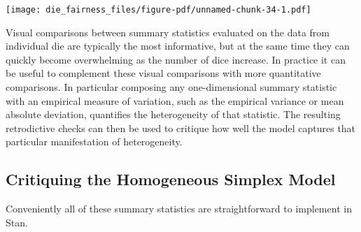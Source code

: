 \documentclass[
  letterpaper,
  DIV=11,
  numbers=noendperiod]{scrartcl}
\newenvironment{Shaded}{\begin{snugshade}}{\end{snugshade}}
\newcommand{\AttributeTok}[1]{\textcolor[rgb]{0.40,0.45,0.13}{#1}}
\newcommand{\ConstantTok}[1]{\textcolor[rgb]{0.56,0.35,0.01}{#1}}
\newcommand{\DecValTok}[1]{\textcolor[rgb]{0.68,0.00,0.00}{#1}}
\newcommand{\FloatTok}[1]{\textcolor[rgb]{0.68,0.00,0.00}{#1}}
\newcommand{\FunctionTok}[1]{\textcolor[rgb]{0.28,0.35,0.67}{#1}}
\newcommand{\NormalTok}[1]{\textcolor[rgb]{0.00,0.23,0.31}{#1}}
\newcommand{\OtherTok}[1]{\textcolor[rgb]{0.00,0.23,0.31}{#1}}
\newcommand{\SpecialCharTok}[1]{\textcolor[rgb]{0.37,0.37,0.37}{#1}}
\newcommand{\StringTok}[1]{\textcolor[rgb]{0.13,0.47,0.30}{#1}}
\begin{document}
\begin{Shaded}
\end{Shaded}

\texttt{[image: die\_fairness\_files/figure-pdf/unnamed-chunk-34-1.pdf]}

Visual comparisons between summary statistics evaluated on the data from
individual die are typically the most informative, but at the same time
they can quickly become overwhelming as the number of dice increase. In
practice it can be useful to complement these visual comparisons with
more quantitative comparisons. In particular composing any
one-dimensional summary statistic with an empirical measure of
variation, such as the empirical variance or mean absolute deviation,
quantifies the heterogeneity of that statistic. The resulting
retrodictive checks can then be used to critique how well the model
captures that particular manifestation of heterogeneity.

\subsection{Critiquing the Homogeneous Simplex
Model}\label{critiquing-the-homogeneous-simplex-model}

Conveniently all of these summary statistics are straightforward to
implement in Stan.
\end{document}
